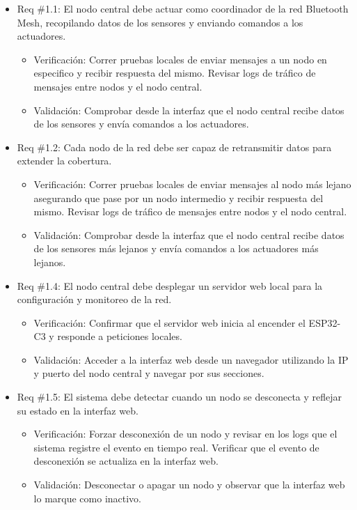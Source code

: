 \documentclass[
11pt, %
]{charter}
\begin{document}
\begin{itemize} 
\item Req \#1.1: El nodo central debe actuar como coordinador de la red Bluetooth Mesh, recopilando datos de los sensores y enviando comandos a los actuadores.
\begin{itemize}
	\item Verificación: Correr pruebas locales de enviar mensajes a un nodo en especifico y recibir respuesta del mismo. Revisar logs de tráfico de mensajes entre nodos y el nodo central.
	\item Validación: Comprobar desde la interfaz que el nodo central recibe datos de los sensores y envía comandos a los actuadores.
\end{itemize}


\item Req \#1.2: Cada nodo de la red debe ser capaz de retransmitir datos para extender la cobertura.
\begin{itemize}
	\item Verificación: Correr pruebas locales de enviar mensajes al nodo más lejano asegurando que pase por un nodo intermedio y recibir respuesta del mismo. Revisar logs de tráfico de mensajes entre nodos y el nodo central.
	\item Validación: Comprobar desde la interfaz que el nodo central recibe datos de los sensores más lejanos y envía comandos a los actuadores más lejanos.
\end{itemize}


\item Req \#1.4: El nodo central debe desplegar un servidor web local para la configuración y monitoreo de la red.
\begin{itemize}
	\item Verificación: Confirmar que el servidor web inicia al encender el ESP32-C3 y responde a peticiones locales.
	\item Validación: Acceder a la interfaz web desde un navegador utilizando la IP y puerto del nodo central y navegar por sus secciones.
\end{itemize}


\item Req \#1.5: El sistema debe detectar cuando un nodo se desconecta y reflejar su estado en la interfaz web.
\begin{itemize}
	\item Verificación: Forzar desconexión de un nodo y revisar en los logs que el sistema registre el evento en tiempo real. Verificar que el evento de desconexión se actualiza en la interfaz web.
	\item Validación: Desconectar o apagar un nodo y observar que la interfaz web lo marque como inactivo.
\end{itemize}



\end{itemize}
\end{document}

